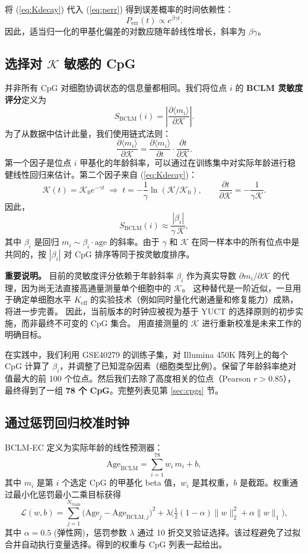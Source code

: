 \documentclass[12pt,a4paper,fontset=fandol]{ctexart}
\newcommand{\REL}{\mathcal{K}}          %
\begin{document}
	将 (\ref{eq:Kdecay}) 代入 (\ref{eq:perr}) 得到误差概率的时间依赖性：
	\[
	P_{\mathrm{err}}(t) \propto e^{\beta\gamma t}.
	\]
	因此，适当归一化的甲基化偏差的对数应随年龄线性增长，斜率为 \(\beta\gamma\)。
	
	\subsection{选择对 \(\REL\) 敏感的 CpG}
	并非所有 CpG 对细胞协调状态的信息量都相同。我们将位点 \(i\) 的 \textbf{BCLM 灵敏度评分}定义为
	\begin{equation}
		S_{\mathrm{BCLM}}(i) = \left| \frac{\partial \langle m_i \rangle}{\partial \REL} \right|.
		\label{eq:sensitivity}
	\end{equation}
	为了从数据中估计此量，我们使用链式法则：
	\[
	\frac{\partial \langle m_i \rangle}{\partial \REL} = \frac{\partial \langle m_i \rangle}{\partial t} \cdot \frac{\partial t}{\partial \REL}.
	\]
	第一个因子是位点 \(i\) 甲基化的年龄斜率，可以通过在训练集中对实际年龄进行稳健线性回归来估计。第二个因子来自 (\ref{eq:Kdecay})：
	\[
	\REL(t) = \REL_0 e^{-\gamma t} \;\Longrightarrow\; t = -\frac{1}{\gamma}\ln(\REL/\REL_0),\qquad
	\frac{\partial t}{\partial \REL} = -\frac{1}{\gamma \REL}.
	\]
	因此，
	\[
	S_{\mathrm{BCLM}}(i) \approx \frac{|\beta_i|}{\gamma \, \REL},
	\]
	其中 \(\beta_i\) 是回归 \(m_i \sim \beta_i \cdot \text{age}\) 的斜率。由于 \(\gamma\) 和 \(\REL\) 在同一样本中的所有位点中是共同的，按 \(|\beta_i|\) 对 CpG 排序等同于按灵敏度排序。
	
	\textbf{重要说明。}
	目前的灵敏度评分依赖于年龄斜率 \(\beta_i\) 作为真实导数 \(\partial m_i/\partial \REL\) 的代理，因为尚无法直接高通量测量单个细胞中的 \(\REL\)。
	这种替代是一阶近似，一旦用于确定单细胞水平 \(K_{\mathrm{eff}}\) 的实验技术（例如同时量化代谢通量和修复能力）成熟，将进一步完善。
	因此，当前版本的时钟应被视为基于 YUCT 的选择原则的初步实施，而非最终不可变的 CpG 集合。
	用直接测量的 \(\REL\) 进行重新校准是未来工作的明确目标。
	
	在实践中，我们利用 GSE40279 的训练子集，对 Illumina 450K 阵列上的每个 CpG 计算了 \(\beta_i\)，并调整了已知混杂因素（细胞类型比例）。保留了年龄斜率绝对值最大的前 100 个位点。然后我们去除了高度相关的位点（Pearson \(r > 0.85\)），最终得到了一组 \textbf{78 个 CpG}。完整列表见第 \ref{sec:cpgs} 节。
	
	\subsection{通过惩罚回归校准时钟}
	BCLM‑EC 定义为实际年龄的线性预测器：
	\begin{equation}
		\mathrm{Age}_{\mathrm{BCLM}} = \sum_{i=1}^{78} w_i \, m_i + b,
		\label{eq:clock}
	\end{equation}
	其中 \(m_i\) 是第 \(i\) 个选定 CpG 的甲基化 beta 值，\(w_i\) 是其权重，\(b\) 是截距。权重通过最小化惩罚最小二乘目标获得
	\[
	\mathcal{L}(w,b) = \sum_{j=1}^{N_{\mathrm{train}}} \bigl( \mathrm{Age}_j - \mathrm{Age}_{\mathrm{BCLM},j} \bigr)^2 + \lambda \bigl( \tfrac{1}{2}(1-\alpha)\|w\|_2^2 + \alpha\|w\|_1 \bigr),
	\]
	其中 \(\alpha=0.5\) (弹性网)，惩罚参数 \(\lambda\) 通过 10 折交叉验证选择。该过程避免了过拟合并自动执行变量选择。得到的权重与 CpG 列表一起给出。
	
\end{document}
